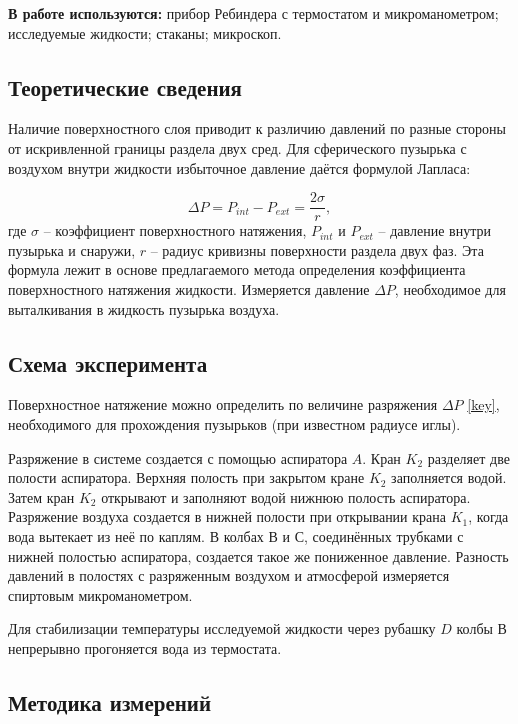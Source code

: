 \documentclass[12pt,a4paper]{article}
\begin{document}
\textbf{В работе используются:} прибор  Ребиндера  с термостатом и микроманометром; исследуемые жидкости; стаканы; микроскоп.
\subsection{Теоретические сведения}

Наличие поверхностного слоя приводит к различию давлений по разные стороны от искривленной границы раздела двух сред.  Для сферического пузырька с воздухом  внутри жидкости избыточное давление даётся формулой Лапласа:

\begin{equation}\label{key}
\Delta P = P_{int} - P_{ext} = \frac{2\sigma}{r},
\end{equation}
где $ \sigma $ -- коэффициент поверхностного натяжения, $ P_{int} $ и $ P_{ext} $ -- давление внутри пузырька и снаружи, $ r $ -- радиус кривизны поверхности раздела двух фаз. Эта формула лежит в основе предлагаемого метода определения коэффициента поверхностного натяжения жидкости. Измеряется давление $ \Delta P $, необходимое для выталкивания в жидкость пузырька воздуха.

\subsection{Схема эксперимента}


Поверхностное натяжение можно определить по величине разряжения $ \Delta P $ \eqref{key}, необходимого для прохождения пузырьков (при известном радиусе иглы).

Разряжение в системе создается с помощью аспиратора $ A $. Кран $ K_2 $ разделяет две полости аспиратора. Верхняя полость при закрытом кране $ K_2 $ заполняется водой. Затем кран $ K_2 $ открывают и заполняют водой  нижнюю полость  аспиратора.  Разряжение воздуха создается в нижней полости  при открывании крана $ K_1 $, когда  вода вытекает из неё по каплям. В колбах $ В $ и $ С $, соединённых трубками с нижней полостью аспиратора, создается такое же пониженное давление. Разность давлений в полостях с разряженным воздухом и атмосферой измеряется спиртовым микроманометром. 

Для стабилизации температуры исследуемой жидкости через рубашку $ D $ колбы $ В $ непрерывно прогоняется вода из термостата.

\subsection{Методика измерений}
\end{document}
